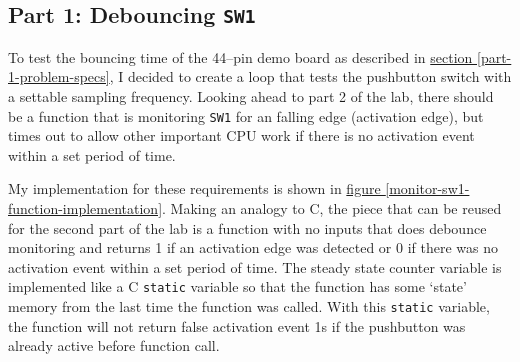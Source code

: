 \documentclass[11pt]{article}
\begin{document}
\subsection{Part 1: Debouncing \texttt{SW1}}

To test the bouncing time of the 44--pin demo board as described in
\hyperref[part-1-problem-specs]{section \ref{part-1-problem-specs}},
I decided to create a loop that tests the pushbutton switch with a
settable sampling frequency. Looking ahead to part 2 of the lab,
there should be a function that is monitoring \texttt{SW1} for an
falling edge (activation edge), but times out to allow other important
CPU work if there is no activation event within a set period of time.

My implementation for these requirements is shown in
\hyperref[monitor-sw1-function-implementation]{figure \ref{monitor-sw1-function-implementation}}.
Making an analogy to C, the piece that can be reused for the second part of the lab
is a function with no inputs that does debounce monitoring and returns 1
if an activation edge was detected or 0 if there was no activation event within
a set period of time. The steady state counter variable is implemented like a C
\texttt{static} variable so that the function has some `state' memory from the
last time the function was called. With this \texttt{static} variable, the function
will not return false activation event 1s if the pushbutton was already active before
function call.
\end{document}
